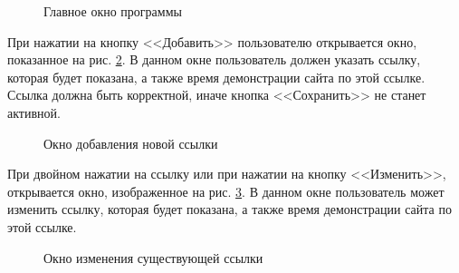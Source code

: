 \documentclass[a4paper, 14pt]{extarticle}
\begin{document}
\begin{figure}[H]
  \centering
  \caption{Главное окно программы}
  \label{fig:main-window}
\end{figure}

При нажатии на кнопку <<Добавить>> пользователю открывается окно, показанное на
рис. \ref{fig:create-window}. В данном окне пользователь должен указать ссылку,
которая будет показана, а также время демонстрации сайта по этой ссылке. Ссылка
должна быть корректной, иначе кнопка <<Сохранить>> не станет активной.

\begin{figure}[H]
  \centering
  \caption{Окно добавления новой ссылки}
  \label{fig:create-window}
\end{figure}

При двойном нажатии на ссылку или при нажатии на кнопку <<Изменить>>,
открывается окно, изображенное на рис. \ref{fig:change-window}. В данном окне
пользователь может изменить ссылку, которая будет показана, а также время
демонстрации сайта по этой ссылке.

\begin{figure}[H]
  \centering
  \caption{Окно изменения существующей ссылки}
  \label{fig:change-window}
\end{figure}
\end{document}
